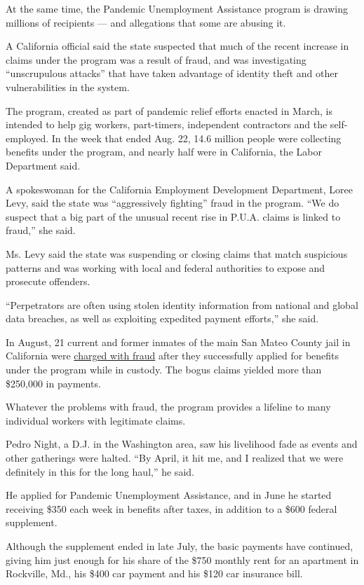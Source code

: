 At the same time, the Pandemic Unemployment Assistance program is
drawing millions of recipients --- and allegations that some are abusing
it.

A California official said the state suspected that much of the recent
increase in claims under the program was a result of fraud, and was
investigating ``unscrupulous attacks'' that have taken advantage of
identity theft and other vulnerabilities in the system.

The program, created as part of pandemic relief efforts enacted in
March, is intended to help gig workers, part-timers, independent
contractors and the self-employed. In the week that ended Aug. 22, 14.6
million people were collecting benefits under the program, and nearly
half were in California, the Labor Department said.

A spokeswoman for the California Employment Development Department,
Loree Levy, said the state was ``aggressively fighting'' fraud in the
program. ``We do suspect that a big part of the unusual recent rise in
P.U.A. claims is linked to fraud,'' she said.

Ms. Levy said the state was suspending or closing claims that match
suspicious patterns and was working with local and federal authorities
to expose and prosecute offenders.

``Perpetrators are often using stolen identity information from national
and global data breaches, as well as exploiting expedited payment
efforts,'' she said.

In August, 21 current and former inmates of the main San Mateo County
jail in California were
\href{https://www.nytimes3xbfgragh.onion/2020/08/17/us/unemployment-fraud-jail-california.html}{charged
with fraud} after they successfully applied for benefits under the
program while in custody. The bogus claims yielded more than \$250,000
in payments.

Whatever the problems with fraud, the program provides a lifeline to
many individual workers with legitimate claims.

Pedro Night, a D.J. in the Washington area, saw his livelihood fade as
events and other gatherings were halted. ``By April, it hit me, and I
realized that we were definitely in this for the long haul,'' he said.

He applied for Pandemic Unemployment Assistance, and in June he started
receiving \$350 each week in benefits after taxes, in addition to a
\$600 federal supplement.

Although the supplement ended in late July, the basic payments have
continued, giving him just enough for his share of the \$750 monthly
rent for an apartment in Rockville, Md., his \$400 car payment and his
\$120 car insurance bill.

